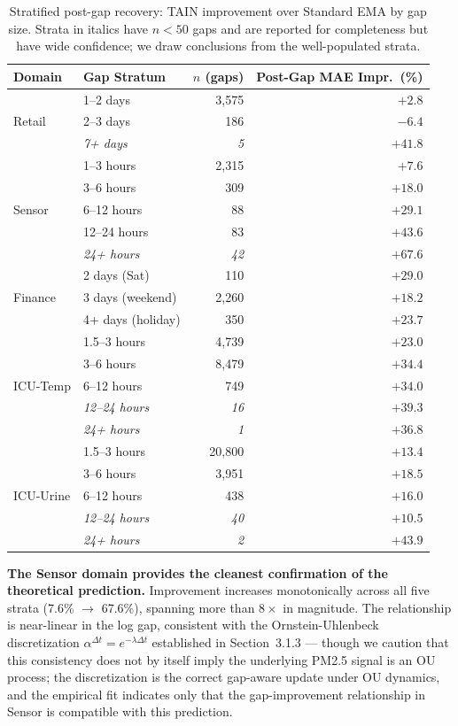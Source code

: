 \documentclass[11pt,a4paper]{article}
\begin{document}
\begin{table}[h]
\centering
\caption{Stratified post-gap recovery: TAIN improvement over Standard EMA by gap
size. Strata in italics have $n < 50$ gaps and are reported for completeness
but have wide confidence; we draw conclusions from the well-populated strata.}
\label{tab:stratified}
\begin{tabular}{llrr}
\toprule
Domain & Gap Stratum & $n$ (gaps) & Post-Gap MAE Impr.\ (\%) \\
\midrule
\multirow{3}{*}{Retail}
& 1--2 days  & 3{,}575 & $+2.8$ \\
& 2--3 days  & 186 & $-6.4$ \\
& \emph{7+ days}    & \emph{5} & \emph{$+41.8$} \\
\midrule
\multirow{5}{*}{Sensor}
& 1--3 hours   & 2{,}315 & $+7.6$ \\
& 3--6 hours   & 309 & $+18.0$ \\
& 6--12 hours  & 88 & $+29.1$ \\
& 12--24 hours & 83 & $+43.6$ \\
& \emph{24+ hours}   & \emph{42} & \emph{$+67.6$} \\
\midrule
\multirow{3}{*}{Finance}
& 2 days (Sat)       & 110 & $+29.0$ \\
& 3 days (weekend)   & 2{,}260 & $+18.2$ \\
& 4+ days (holiday)  & 350 & $+23.7$ \\
\midrule
\multirow{5}{*}{ICU-Temp}
& 1.5--3 hours  & 4{,}739 & $+23.0$ \\
& 3--6 hours    & 8{,}479 & $+34.4$ \\
& 6--12 hours   & 749 & $+34.0$ \\
& \emph{12--24 hours} & \emph{16} & \emph{$+39.3$} \\
& \emph{24+ hours}    & \emph{1}  & \emph{$+36.8$} \\
\midrule
\multirow{5}{*}{ICU-Urine}
& 1.5--3 hours  & 20{,}800 & $+13.4$ \\
& 3--6 hours    & 3{,}951 & $+18.5$ \\
& 6--12 hours   & 438 & $+16.0$ \\
& \emph{12--24 hours} & \emph{40} & \emph{$+10.5$} \\
& \emph{24+ hours}    & \emph{2}  & \emph{$+43.9$} \\
\bottomrule
\end{tabular}
\end{table}

\textbf{The Sensor domain provides the cleanest confirmation of the
theoretical prediction.} Improvement increases monotonically across all five
strata (7.6\% $\to$ 67.6\%), spanning more than $8\times$ in magnitude. The
relationship is near-linear in the log gap, consistent with the
Ornstein-Uhlenbeck discretization $\alpha^{\Delta t} = e^{-\lambda \Delta t}$
established in Section~3.1.3 --- though we caution that this consistency does
not by itself imply the underlying PM2.5 signal is an OU process; the
discretization is the correct gap-aware update under OU dynamics, and the
empirical fit indicates only that the gap-improvement relationship in Sensor
is compatible with this prediction.
\end{document}
